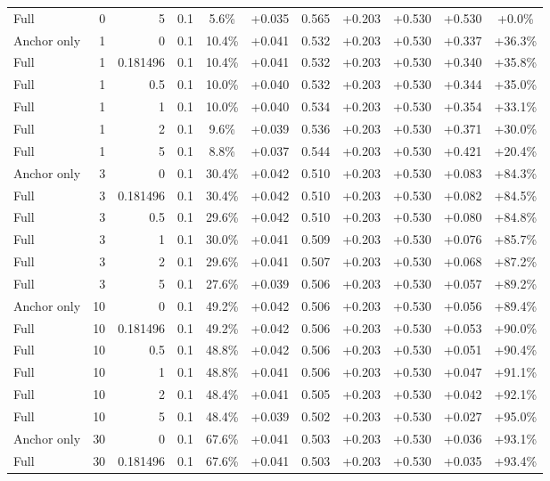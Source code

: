 \begin{table}[htbp]
\begin{tabular}{lrrrccccccc}
Full & 0 & 5 & 0.1 & 5.6\% & +0.035 & 0.565 & +0.203 & +0.530 & +0.530 & +0.0\% \\
Anchor only & 1 & 0 & 0.1 & 10.4\% & +0.041 & 0.532 & +0.203 & +0.530 & +0.337 & +36.3\% \\
Full & 1 & 0.181496 & 0.1 & 10.4\% & +0.041 & 0.532 & +0.203 & +0.530 & +0.340 & +35.8\% \\
Full & 1 & 0.5 & 0.1 & 10.0\% & +0.040 & 0.532 & +0.203 & +0.530 & +0.344 & +35.0\% \\
Full & 1 & 1 & 0.1 & 10.0\% & +0.040 & 0.534 & +0.203 & +0.530 & +0.354 & +33.1\% \\
Full & 1 & 2 & 0.1 & 9.6\% & +0.039 & 0.536 & +0.203 & +0.530 & +0.371 & +30.0\% \\
Full & 1 & 5 & 0.1 & 8.8\% & +0.037 & 0.544 & +0.203 & +0.530 & +0.421 & +20.4\% \\
Anchor only & 3 & 0 & 0.1 & 30.4\% & +0.042 & 0.510 & +0.203 & +0.530 & +0.083 & +84.3\% \\
Full & 3 & 0.181496 & 0.1 & 30.4\% & +0.042 & 0.510 & +0.203 & +0.530 & +0.082 & +84.5\% \\
Full & 3 & 0.5 & 0.1 & 29.6\% & +0.042 & 0.510 & +0.203 & +0.530 & +0.080 & +84.8\% \\
Full & 3 & 1 & 0.1 & 30.0\% & +0.041 & 0.509 & +0.203 & +0.530 & +0.076 & +85.7\% \\
Full & 3 & 2 & 0.1 & 29.6\% & +0.041 & 0.507 & +0.203 & +0.530 & +0.068 & +87.2\% \\
Full & 3 & 5 & 0.1 & 27.6\% & +0.039 & 0.506 & +0.203 & +0.530 & +0.057 & +89.2\% \\
Anchor only & 10 & 0 & 0.1 & 49.2\% & +0.042 & 0.506 & +0.203 & +0.530 & +0.056 & +89.4\% \\
Full & 10 & 0.181496 & 0.1 & 49.2\% & +0.042 & 0.506 & +0.203 & +0.530 & +0.053 & +90.0\% \\
Full & 10 & 0.5 & 0.1 & 48.8\% & +0.042 & 0.506 & +0.203 & +0.530 & +0.051 & +90.4\% \\
Full & 10 & 1 & 0.1 & 48.8\% & +0.041 & 0.506 & +0.203 & +0.530 & +0.047 & +91.1\% \\
Full & 10 & 2 & 0.1 & 48.4\% & +0.041 & 0.505 & +0.203 & +0.530 & +0.042 & +92.1\% \\
Full & 10 & 5 & 0.1 & 48.4\% & +0.039 & 0.502 & +0.203 & +0.530 & +0.027 & +95.0\% \\
Anchor only & 30 & 0 & 0.1 & 67.6\% & +0.041 & 0.503 & +0.203 & +0.530 & +0.036 & +93.1\% \\
Full & 30 & 0.181496 & 0.1 & 67.6\% & +0.041 & 0.503 & +0.203 & +0.530 & +0.035 & +93.4\% \\

\end{tabular}
\end{table}
